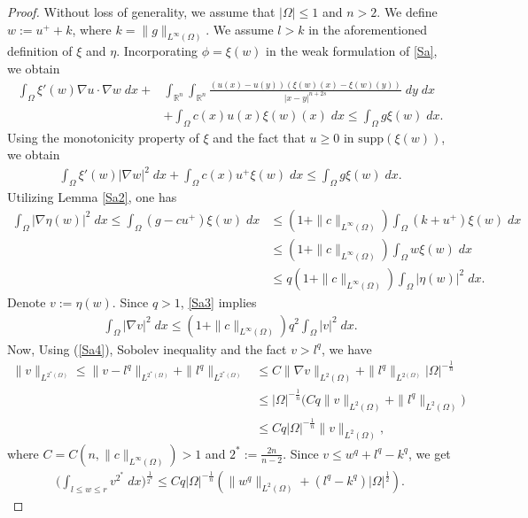 \documentclass[10pt,a4paper]{amsart}
\def\R{\mathbb{R}}
\begin{document}
\begin{proof}
Without loss of generality, we assume that $|\Omega|\leq 1$ and $n>2$. We define $w:=u^++k$, where $k=\|g\|_{L^\infty(\Omega)}$. We assume $l>k$ in the aforementioned definition of $\xi$ and $\eta$. Incorporating $\phi=\xi(w)$ in the weak formulation of \eqref{Sa}, we obtain 
\begin{align*}
    \int_\Omega \xi'(w)\nabla u\cdot\nabla w\;dx+&\int_{\R^n}\int_{\R^n}\frac{(u(x)-u(y))(\xi(w)(x)-\xi(w)(y))}{|x-y|^{n+2s}}\;dy\;dx\nonumber\\
    &+\int_{\Omega}c(x)u(x)\xi(w)(x)\;dx\leq\int_{\Omega}g\xi(w)\;dx.
\end{align*}
Using the monotonicity property of $\xi$ and the fact that $ u\geq 0$ in $\mathrm{supp}(\xi(w))$, we obtain
\begin{align*}
    \int_\Omega \xi'(w)|\nabla w|^2\;dx+\int_{\Omega}c(x)u^+\xi(w)\;dx\leq\int_{\Omega}g\xi(w)\;dx.
\end{align*}
Utilizing Lemma \ref{Sa2}, one has
\begin{align}\label{Sa3}
     \int_\Omega |\nabla\eta(w)|^2\;dx\leq\int_{\Omega}(g-cu^+)\xi(w)\;dx&\leq (1+\|c\|_{L^\infty(\Omega)})\int_{\Omega}(k+u^+)\xi(w)\;dx \nonumber\\
     &\leq (1+\|c\|_{L^\infty(\Omega)})\int_\Omega w\xi(w)\;dx\nonumber\\
     &\leq q(1+\|c\|_{L^\infty(\Omega)})\int_\Omega |\eta(w)|^2\;dx.
\end{align}
Denote $v:=\eta(w)$. Since $q>1$, \eqref{Sa3} implies
\begin{align}\label{Sa4}
    \int_\Omega |\nabla v|^2\;dx\leq (1+\|c\|_{L^\infty(\Omega)})q^2\int_\Omega |v|^2\;dx.
\end{align}
Now, Using (\ref{Sa4}), Sobolev inequality and the fact $v>l^q$, we have
\begin{align*}
    \|v\|_{L^{2^*(\Omega)}}\leq \|v-l^q\|_{L^{2^*(\Omega)}}+\|l^q\|_{L^{2^*(\Omega)}}&\leq C\|\nabla v\|_{L^2(\Omega)}+\|l^q\|_{L^{2(\Omega)}}|\Omega|^{-\frac{1}{n}}\nonumber\\
    &\leq |\Omega|^{-\frac{1}{n}}\Big(Cq\|v\|_{L^2(\Omega)}+\|l^q\|_{L^2(\Omega)}\Big)\nonumber\\
    &\leq Cq|\Omega|^{-\frac{1}{n}}\|v\|_{L^2(\Omega)},
\end{align*}
where $C=C(n,\|c\|_{L^\infty(\Omega)})>1$ and $2^*:=\frac{2n}{n-2}$. Since $v\leq w^q+l^q-k^q$, we get
\begin{align*}
    \Big(\int_{l\leq w\leq r}v^{2^*}\;dx\Big)^\frac{1}{2^*}\leq Cq|\Omega|^{-\frac{1}{n}}\left(\|w^q\|_{L^2(\Omega)}+(l^q-k^q)|\Omega|^\frac{1}{2}\right).

\end{align*}
\end{proof}
\end{document}
